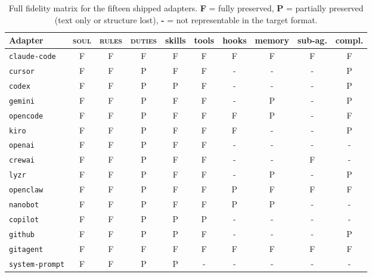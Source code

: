 \documentclass[11pt,a4paper]{article}
\begin{document}
\begin{table}[h]
\centering
\scriptsize
\begin{tabular}{@{}lccccccccc@{}}
\toprule
Adapter & \textsc{soul} & \textsc{rules} & \textsc{duties} & skills & tools & hooks & memory & sub-ag. & compl. \\
\midrule
\texttt{claude-code}     & F & F & F & F & F & F & F & F & F \\
\texttt{cursor}          & F & F & P & F & F & - & - & - & P \\
\texttt{codex}           & F & F & P & P & F & - & - & - & P \\
\texttt{gemini}          & F & F & P & F & F & - & P & - & P \\
\texttt{opencode}        & F & F & P & F & F & F & P & - & F \\
\texttt{kiro}            & F & F & P & F & F & F & - & - & P \\
\texttt{openai}          & F & F & P & F & F & - & - & - & - \\
\texttt{crewai}          & F & F & P & F & F & - & - & F & - \\
\texttt{lyzr}            & F & F & P & F & F & - & P & - & P \\
\texttt{openclaw}        & F & F & P & F & F & P & F & F & F \\
\texttt{nanobot}         & F & F & P & F & F & P & P & - & - \\
\texttt{copilot}         & F & F & P & P & P & - & - & - & - \\
\texttt{github}          & F & F & P & P & F & - & - & - & P \\
\texttt{gitagent}         & F & F & F & F & F & F & F & F & F \\
\texttt{system-prompt}   & F & F & P & P & - & - & - & - & - \\
\bottomrule
\end{tabular}
\caption{Full fidelity matrix for the fifteen shipped adapters. \textbf{F} = fully
preserved, \textbf{P} = partially preserved (text only or structure lost), \textbf{-}
= not representable in the target format.}
\end{table}
\end{document}
